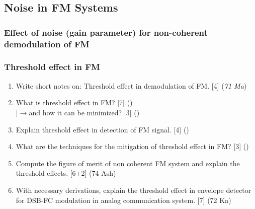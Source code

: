 \documentclass[12pt]{article}
\newcommand{\lb}{\\$\left|\rightarrow\right.$}
\begin{document}
  \subsection{Noise in FM Systems}
    \subsubsection{Effect of noise (gain parameter) for non-coherent demodulation of FM}
    \subsubsection{Threshold effect in FM}
      \begin{enumerate}
        \item Write short notes on: Threshold effect in demodulation of FM. \hfill [4] (\textit{71 Ma})
        
        \item What is threshold effect in FM? \hfill [7] ()
        \lb and how it can be minimized? \hfill [3] ()
        
        \item Explain threshold effect in detection of FM signal. \hfill [4] ()
        
        \item What are the techniques for the mitigation of threshold effect in FM? \hfill [3] ()
        
        \item Compute the figure of merit of non coherent FM system and explain the threshold effects. \hfill [6+2] (74 Ash)
        
        
        \item With necessary derivations, explain the threshold effect in envelope detector for DSB-FC modulation in analog communication system. \hfill [7] (72 Ka)
      \end{enumerate}
\end{document}
